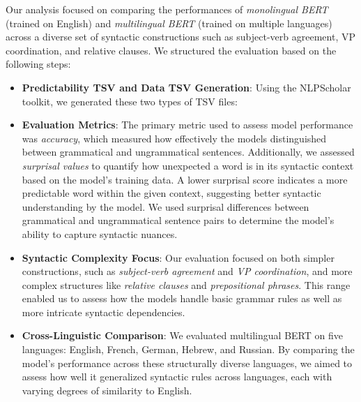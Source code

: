 \documentclass[11pt]{article}
\begin{document}
Our analysis focused on comparing the performances of \textit{monolingual BERT} (trained on English) and \textit{multilingual BERT} (trained on multiple languages) across a diverse set of syntactic constructions such as subject-verb agreement, VP coordination, and relative clauses. We structured the evaluation based on the following steps:

    \begin{itemize}
    \item \textbf{Predictability TSV and Data TSV Generation}: Using the NLPScholar toolkit, we generated these two types of TSV files:

    \item \textbf{Evaluation Metrics}: The primary metric used to assess model performance was \textit{accuracy}, which measured how effectively the models distinguished between grammatical and ungrammatical sentences. Additionally, we assessed \textit{surprisal values} to quantify how unexpected a word is in its syntactic context based on the model's training data. A lower surprisal score indicates a more predictable word within the given context, suggesting better syntactic understanding by the model. We used surprisal differences between grammatical and ungrammatical sentence pairs to determine the model’s ability to capture syntactic nuances. 

    \item \textbf{Syntactic Complexity Focus}: Our evaluation focused on both simpler constructions, such as \textit{subject-verb agreement} and \textit{VP coordination}, and more complex structures like \textit{relative clauses} and \textit{prepositional phrases}. This range enabled us to assess how the models handle basic grammar rules as well as more intricate syntactic dependencies.
    
    \item \textbf{Cross-Linguistic Comparison}: We evaluated multilingual BERT on five languages: English, French, German, Hebrew, and Russian. By comparing the model's performance across these structurally diverse languages, we aimed to assess how well it generalized syntactic rules across languages, each with varying degrees of similarity to English.


\end{itemize}
\end{document}
